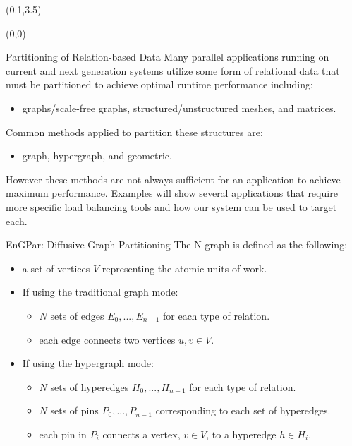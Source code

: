 \documentclass{beamer}
\begin{document}
\begin{textblock}{15.6}(0.1,3.5)
  \begin{textblock}{5}(0,0)
    \begin{block}{\centering Partitioning of Relation-based Data}
      Many parallel applications running on current and next generation systems utilize some form of relational data that must be partitioned to achieve optimal runtime performance including:
      \begin{itemize}
      \item graphs/scale-free graphs, structured/unstructured meshes, and matrices.
      \end{itemize}
      Common methods applied to partition these structures are:
      \begin{itemize}
      \item graph, hypergraph, and geometric.
      \end{itemize}
      However these methods are not always sufficient for an application to achieve maximum performance. Examples will show several applications that require more specific load balancing tools and how our system can be used to target each.
    \end{block}
    \begin{block}{\centering EnGPar: Diffusive Graph Partitioning}
      The N-graph is defined as the following:
      \begin{itemize}
      \item a set of vertices $V$ representing the atomic units of work.
      \item If using the traditional graph mode:
        \begin{itemize}
        \item $N$ sets of edges $E_0,...,E_{n-1}$ for each type of relation.
        \item each edge connects two vertices $u,v \in V$.
        \end{itemize}
      \item If using the hypergraph mode:
        \begin{itemize}
        \item $N$ sets of hyperedges $H_0,...,H_{n-1}$ for each type of relation.
        \item $N$ sets of pins $P_0,...,P_{n-1}$ corresponding to each set of hyperedges.
        \item each pin in $P_i$ connects a vertex, $v \in V$, to a hyperedge $h \in H_i$.
        \end{itemize}
      \end{itemize}


\end{block}
\end{textblock}
\end{textblock}
\end{document}
